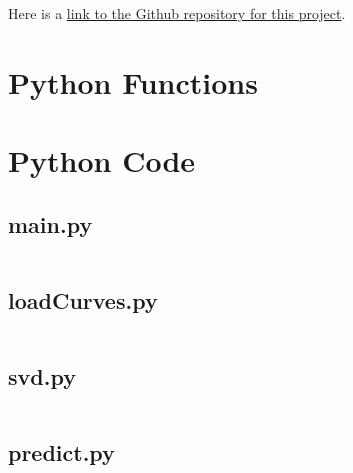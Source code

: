 \documentclass{article}
\begin{document}
    
    

    \FloatBarrier
    \newpage
    \appendix
    Here is a \href{https://github.com/bagriffith/AMATH582/tree/main/Final}
    {link to the Github repository for this project}.
    \section{Python Functions}
    

    \section{Python Code}
    \subsection{main.py}
    \inputminted{python}{../code/main.py}

    \subsection{loadCurves.py}
    \inputminted{python}{../code/loadCurves.py}

    \subsection{svd.py}
    \inputminted{python}{../code/svd.py}

    \subsection{predict.py}
    \inputminted{python}{../code/predict.py}
\end{document}
